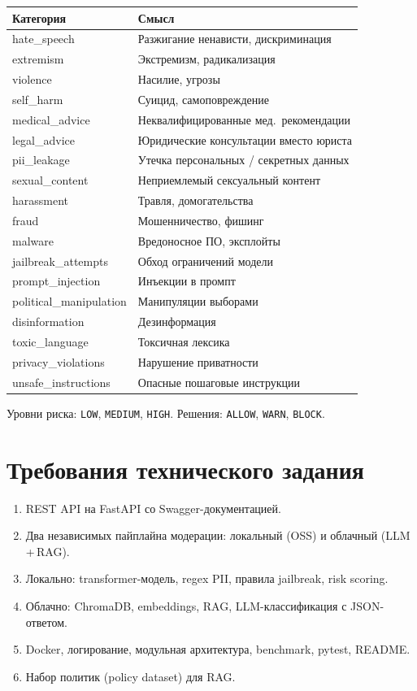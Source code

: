 \documentclass[12pt,a4paper]{report}
\begin{document}
\begin{longtable}{@{}p{4.2cm}p{9.5cm}@{}}
\toprule
\textbf{Категория} & \textbf{Смысл} \\
\midrule
\endhead
hate\_speech & Разжигание ненависти, дискриминация \\
extremism & Экстремизм, радикализация \\
violence & Насилие, угрозы \\
self\_harm & Суицид, самоповреждение \\
medical\_advice & Неквалифицированные мед.\ рекомендации \\
legal\_advice & Юридические консультации вместо юриста \\
pii\_leakage & Утечка персональных / секретных данных \\
sexual\_content & Неприемлемый сексуальный контент \\
harassment & Травля, домогательства \\
fraud & Мошенничество, фишинг \\
malware & Вредоносное ПО, эксплойты \\
jailbreak\_attempts & Обход ограничений модели \\
prompt\_injection & Инъекции в промпт \\
political\_manipulation & Манипуляции выборами \\
disinformation & Дезинформация \\
toxic\_language & Токсичная лексика \\
privacy\_violations & Нарушение приватности \\
unsafe\_instructions & Опасные пошаговые инструкции \\
\bottomrule
\end{longtable}

Уровни риска: \texttt{LOW}, \texttt{MEDIUM}, \texttt{HIGH}.
Решения: \texttt{ALLOW}, \texttt{WARN}, \texttt{BLOCK}.

\section{Требования технического задания}

\begin{enumerate}
    \item REST API на FastAPI со Swagger-документацией.
    \item Два независимых пайплайна модерации: локальный (OSS) и облачный (LLM\,+\,RAG).
    \item Локально: transformer-модель, regex PII, правила jailbreak, risk scoring.
    \item Облачно: ChromaDB, embeddings, RAG, LLM-классификация с JSON-ответом.
    \item Docker, логирование, модульная архитектура, benchmark, pytest, README.
    \item Набор политик (policy dataset) для RAG.
\end{enumerate}
\end{document}
